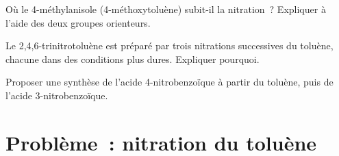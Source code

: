 \begin{exercise}[$\star\star\star$]\label{exo:b2:aromatic-substitution:10}
Où le 4-méthylanisole (4-méthoxytoluène) subit-il la nitration~? Expliquer à l'aide des deux
groupes orienteurs.
\end{exercise}

\begin{exercise}[$\star\star\star$]\label{exo:b2:aromatic-substitution:11}
Le 2,4,6-trinitrotoluène est préparé par trois nitrations successives du toluène, chacune dans des
conditions plus dures. Expliquer pourquoi.
\end{exercise}

\begin{exercise}[$\star\star\star$]\label{exo:b2:aromatic-substitution:12}
Proposer une synthèse de l'acide 4-nitrobenzoïque à partir du toluène, puis de l'acide 3-nitrobenzoïque.
\end{exercise}

\section{Problème~: nitration du toluène}

